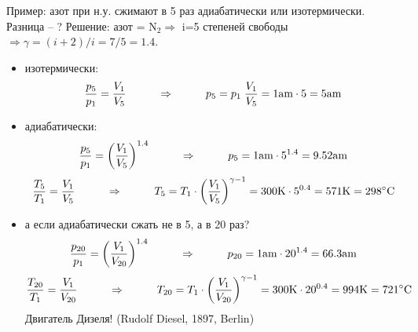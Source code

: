 Пример: азот при н.у. сжимают в 5 раз адиабатически или изотермически. Разница -- ?
Решение: азот = N$_2 \Rightarrow$ i=5 степеней свободы $\Rightarrow \gamma =(i+2)/i =7/5=1.4$. \begin{itemize}
\item изотермически:
       \begin{displaymath}
       \frac{p_5}{p_1}=\frac{V_1}{V_5}\hspace{10mm}\Rightarrow\hspace{10mm}
       p_5=p_1\;\frac{V_1}{V_5}=1{\rm am}\cdot 5 = 5{\rm am}
       \end{displaymath}
\item адиабатически:
       \begin{displaymath}
       \frac{p_5}{p_1}=\left(\frac{V_1}{V_5}\right)^{1.4}\hspace{10mm}\Rightarrow\hspace{10mm}
       p_5=1{\rm am}\cdot 5^{1.4} = 9.52{\rm am}
       \end{displaymath}
       \begin{displaymath}
       \frac{T_5}{T_1}=\frac{V_1}{V_5}\hspace{10mm}\Rightarrow\hspace{10mm}
       T_5=T_1\cdot\left(\frac{V_1}{V_5}\right)^{\gamma-1}=
       300{\rm K}\cdot 5^{0.4} = 571{\rm K}=298^\circ{\rm C}
       \end{displaymath}
\item а если адиабатически сжать не в 5, а в 20 раз?
       \begin{displaymath}
       \frac{p_{20}}{p_1}=\left(\frac{V_1}{V_{20}}\right)^{1.4}\hspace{10mm}\Rightarrow\hspace{10mm}
       p_{20}=1{\rm am}\cdot 20^{1.4} = 66.3{\rm am}
       \end{displaymath}
       \begin{displaymath}
       \frac{T_{20}}{T_1}=\frac{V_1}{V_{20}}\hspace{10mm}\Rightarrow\hspace{10mm}
       T_{20}=T_1\cdot\left(\frac{V_1}{V_{20}}\right)^{\gamma-1}=
       300{\rm K}\cdot 20^{0.4} = 994{\rm K}=721^\circ{\rm C}
       \end{displaymath}
       Двигатель Дизеля! (Rudolf Diesel, 1897, Berlin)
\end{itemize}
